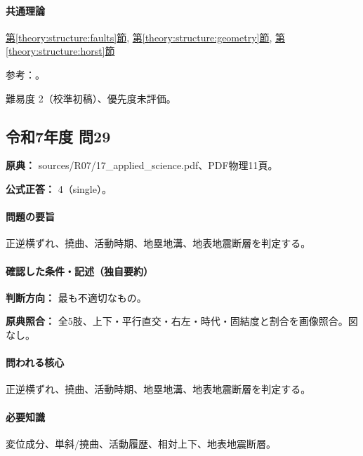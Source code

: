 \paragraph{共通理論} \hyperref[theory:structure:faults]{第\ref*{theory:structure:faults}節}, \hyperref[theory:structure:geometry]{第\ref*{theory:structure:geometry}節}, \hyperref[theory:structure:horst]{第\ref*{theory:structure:horst}節}

\par 参考：\cite{str_listric,str_source}。

\par 難易度 2（校準初稿）、優先度未評価。

\subsection{令和7年度 問29}
\label{q:r07-reg-applied-29}

\noindent\textbf{原典：} sources/R07/17\_applied\_science.pdf、PDF物理11頁。

\textbf{公式正答：} 4（single）。

\paragraph{問題の要旨} 正逆横ずれ、撓曲、活動時期、地塁地溝、地表地震断層を判定する。

\paragraph{確認した条件・記述（独自要約）}\mbox{}\par

\noindent\textbf{判断方向：} 最も不適切なもの。\par

\noindent\textbf{原典照合：} 全5肢、上下・平行直交・右左・時代・固結度と割合を画像照合。図なし。\par

\paragraph{問われる核心} 正逆横ずれ、撓曲、活動時期、地塁地溝、地表地震断層を判定する。

\paragraph{必要知識} 変位成分、単斜/撓曲、活動履歴、相対上下、地表地震断層。

